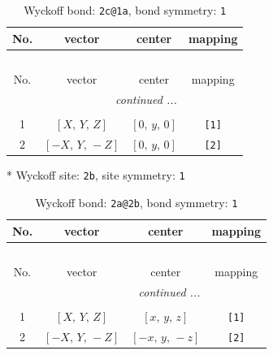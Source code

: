 \documentclass[fleqn,8pt]{jsarticle}
\begin{document}
\begin{longtable}{cccc}
\caption{Wyckoff bond: {\tt 2c@1a}, bond symmetry: {\tt 1}}
 \\
 \hline \hline
No. & vector & center & mapping \\ \hline \endfirsthead

\multicolumn{3}{l}{\tablename\ \thetable{}} \\
 \hline \hline
No. & vector & center & mapping \\ \hline \endhead

 \hline \hline
\multicolumn{3}{r}{\footnotesize\it continued ...} \\ \endfoot

 \hline \hline
\multicolumn{3}{r}{} \\ \endlastfoot

1 & $\left[ X,\, Y,\, Z \right]$ & $\left[ 0,\, y,\, 0 \right]$ & {\tt [1]} \\ \hline
2 & $\left[ - X,\, Y,\, - Z \right]$ & $\left[ 0,\, y,\, 0 \right]$ & {\tt [2]} \\
\end{longtable}
* Wyckoff site: {\tt 2b}, site symmetry: {\tt 1}
\renewcommand{\arraystretch}{1.2}
\begin{longtable}{cccc}
\caption{Wyckoff bond: {\tt 2a@2b}, bond symmetry: {\tt 1}}
 \\
 \hline \hline
No. & vector & center & mapping \\ \hline \endfirsthead

\multicolumn{3}{l}{\tablename\ \thetable{}} \\
 \hline \hline
No. & vector & center & mapping \\ \hline \endhead

 \hline \hline
\multicolumn{3}{r}{\footnotesize\it continued ...} \\ \endfoot

 \hline \hline
\multicolumn{3}{r}{} \\ \endlastfoot

1 & $\left[ X,\, Y,\, Z \right]$ & $\left[ x,\, y,\, z \right]$ & {\tt [1]} \\ \hline
2 & $\left[ - X,\, Y,\, - Z \right]$ & $\left[ - x,\, y,\, - z \right]$ & {\tt [2]} \\
\end{longtable}
\end{document}
